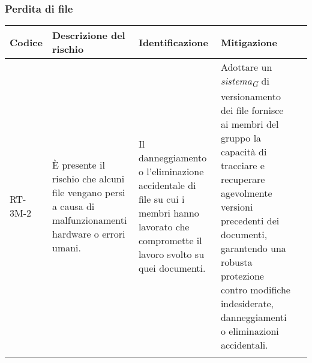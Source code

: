\subsubsection{Perdita di file}
\begin{table}[H]
    \centering
    \begin{tabularx}{\textwidth}{l>{\RaggedRight}X>{\RaggedRight}X>{\RaggedRight}X>{\RaggedRight}X}
    \toprule
    \rowcolor{gray!50}
    \textbf{Codice} & \textbf{Descrizione del rischio} & \textbf{Identificazione} & \textbf{Mitigazione} \\
    \midrule
    \addlinespace 
    RT-3M-2 & 
    È presente il rischio che alcuni file vengano persi a causa di malfunzionamenti hardware o errori umani.&
    Il danneggiamento o l'eliminazione accidentale di file su cui i membri hanno lavorato che compromette il lavoro svolto su quei documenti.&
    Adottare un \textit{sistema}\textsubscript{\textit{G}} di versionamento dei file fornisce ai membri del gruppo la capacità di tracciare e recuperare agevolmente versioni precedenti dei documenti, garantendo una robusta protezione contro modifiche indesiderate, danneggiamenti o eliminazioni accidentali.\\
    \bottomrule
    \addlinespace 
    \end{tabularx}
\end{table}

